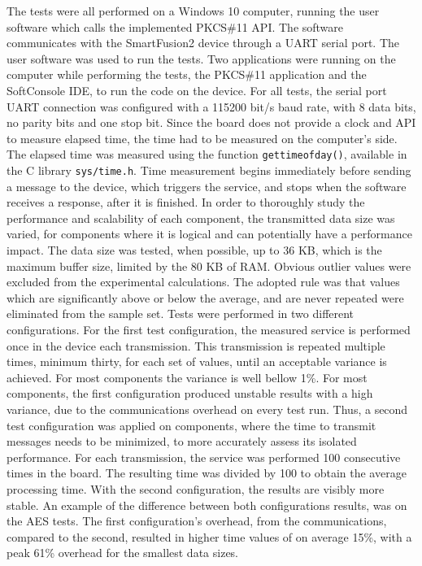 The tests were all performed on a Windows 10 computer, running the user software which calls the implemented PKCS\#11 API. The software communicates with the SmartFusion2 device through a UART serial port. The user software was used to run the tests.
Two applications were running on the computer while performing the tests, the PKCS\#11 application and the SoftConsole IDE, to run the code on the device.
For all tests, the serial port UART connection was configured with a 115200 bit/s baud rate, with 8 data bits, no parity bits and one stop bit.
Since the board does not provide a clock and API to measure elapsed time, the time had to be measured on the computer's side.
The elapsed time was measured using the function \texttt{gettimeofday()}, available in the C library \texttt{sys/time.h}.
Time measurement begins immediately before sending a message to the device, which triggers the service, and stops when the software receives a response, after it is finished.
In order to thoroughly study the performance and scalability of each component, the transmitted data size was varied, for components where it is logical and can potentially have a performance impact. The data size was tested, when possible, up to 36 KB, which is the maximum buffer size, limited by the 80 KB of RAM.
Obvious outlier values were excluded from the experimental calculations. The adopted rule was that values which are significantly above or below the average, and are never repeated were eliminated from the sample set.
Tests were performed in two different configurations.
For the first test configuration, the measured service is performed once in the device each transmission. This transmission is repeated multiple times, minimum thirty, for each set of values, until an acceptable variance is achieved. For most components the variance is well bellow 1\%.
For most components, the first configuration produced unstable results with a high variance, due to the communications overhead on every test run.
Thus, a second test configuration was applied on components, where the time to transmit messages needs to be minimized, to more accurately assess its isolated performance. For each transmission, the service was performed 100 consecutive times in the board. The resulting time was divided by 100 to obtain the average processing time.
With the second configuration, the results are visibly more stable.
An example of the difference between both configurations results, was on the AES tests. The first configuration's overhead, from the communications, compared to the second, resulted in higher time values of on average 15\%, with a peak 61\% overhead for the smallest data sizes.%

